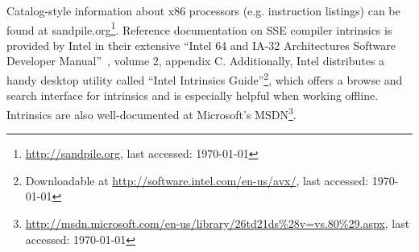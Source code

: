 Catalog-style information about x86 processors (e.g. instruction listings) can be found at sandpile.org\footnote{\url{http://sandpile.org}, last accessed: \today{}}. Reference documentation on SSE compiler intrinsics is provided by Intel in their extensive ``Intel 64 and IA-32 Architectures Software Developer Manual''~\cite{intel2012architectures}, volume 2, appendix C. Additionally, Intel distributes a handy desktop utility called ``Intel Intrinsics Guide''\footnote{Downloadable at \url{http://software.intel.com/en-us/avx/}, last accessed: \today{}}, which offers a browse and search interface for intrinsics and is especially helpful when working offline. Intrinsics are also well-documented at Microsoft's MSDN\footnote{\url{http://msdn.microsoft.com/en-us/library/26td21ds\%28v=vs.80\%29.aspx}, last accessed: \today{}}.
